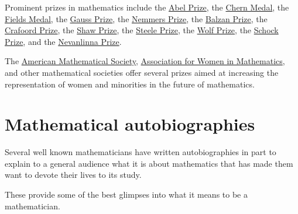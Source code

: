 \documentclass{book}
\numberwithin{equation}{section}
\begin{document}
Prominent prizes in mathematics include the \href{https://en.wikipedia.org/wiki/Abel_Prize}{Abel Prize}, the \href{https://en.wikipedia.org/wiki/Chern_Medal}{Chern Medal}, the \href{https://en.wikipedia.org/wiki/Fields_Medal}{Fields Medal}, the \href{https://en.wikipedia.org/wiki/Gauss_Prize}{Gauss Prize}, the \href{https://en.wikipedia.org/wiki/Frederic_Esser_Nemmers_Prize}{Nemmers Prize}, the \href{https://en.wikipedia.org/wiki/Balzan_Prize}{Balzan Prize}, the \href{https://en.wikipedia.org/wiki/Crafoord_Prize}{Crafoord Prize}, the \href{https://en.wikipedia.org/wiki/Shaw_Prize}{Shaw Prize}, the \href{https://en.wikipedia.org/wiki/Steele_Prize}{Steele Prize}, the \href{https://en.wikipedia.org/wiki/Wolf_Prize}{Wolf Prize}, the \href{https://en.wikipedia.org/wiki/Schock_Prize}{Schock Prize}, and the \href{https://en.wikipedia.org/wiki/Nevanlinna_Prize}{Nevanlinna Prize}.

%
The \href{https://en.wikipedia.org/wiki/American_Mathematical_Society}{American Mathematical Society}, \href{https://en.wikipedia.org/wiki/Association_for_Women_in_Mathematics}{Association for Women in Mathematics}, and other mathematical societies offer several prizes aimed at increasing the representation of women and minorities in the future of mathematics.

\section{Mathematical autobiographies}
Several well known mathematicians have written autobiographies in part to explain to a general audience what it is about mathematics that has made them want to devote their lives to its study.

These provide some of the best glimpses into what it means to be a mathematician.
\end{document}
